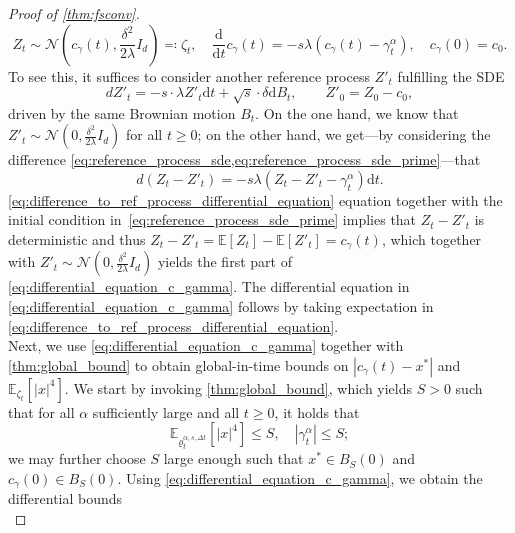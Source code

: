 \documentclass[reqno]{amsart}
\numberwithin{algorithm}{section}
\newcommand{\diff}{\mathrm{d}}
\newcommand{\EE}{{\mathbb E}}
\newcommand{\mc}[1]{\mathcal{#1}}
\begin{document}
{\begin{proof}[Proof of \cref{thm:fsconv}]
\begin{equation}
        Z_t \sim \mc{N}(c_\gamma(t), \frac{\delta^2}{2\lambda} I_d) \eqqcolon \zeta_t, \quad\frac{\diff}{\diff t} c_\gamma(t) = -s \lambda (c_\gamma(t) - \gamma^\alpha_t), \quad c_\gamma(0) = c_0.
    \end{equation}
    To see this, it suffices to consider another reference process $Z'_t$ fulfilling the SDE
    \begin{equation}\label{eq:reference_process_sde_prime}
        dZ'_t = -s \cdot \lambda Z'_t \diff t + \sqrt{s}\cdot\delta \diff B_t, \qquad Z'_0 = Z_0 - c_0, 
    \end{equation}
    driven by the same Brownian motion $B_t$. On the one hand, we know that $Z'_t \sim \mc{N}(0, \frac{\delta^2}{2\lambda} I_d)$ for all $t \geq 0$; on the other hand, we get---by considering the difference \cref{eq:reference_process_sde,eq:reference_process_sde_prime}---that
    \begin{equation}\label{eq:difference_to_ref_process_differential_equation}
        d(Z_t - Z'_t) = - s \lambda (Z_t - Z'_t - \gamma^\alpha_t) \diff t.
    \end{equation}
    \cref{eq:difference_to_ref_process_differential_equation} equation together with the initial condition in~\eqref{eq:reference_process_sde_prime} implies that $Z_t - Z'_t$ is deterministic and thus $Z_t - Z'_t = \EE[Z_t] - \EE[Z'_t] = c_\gamma(t)$, which together with $Z'_t \sim \mc{N}(0, \frac{\delta^2}{2\lambda} I_d)$ yields the first part of \cref{eq:differential_equation_c_gamma}. The differential equation in \cref{eq:differential_equation_c_gamma} follows by taking expectation in \cref{eq:difference_to_ref_process_differential_equation}. \\
   Next, we use \cref{eq:differential_equation_c_gamma} together with \cref{thm:global_bound} to obtain global-in-time bounds on $|c_\gamma(t) - x^*|$ and $\EE_{\zeta_t}[|x|^4]$. We start by invoking \cref{thm:global_bound}, which yields $S > 0$ such that for all $\alpha$ sufficiently large and all $t \geq 0$, it holds that
    \begin{equation}\label{eq:global_in_time_bounds_in_proof}
        \EE_{\varrho_{t}^{\alpha,s,\Delta t}}[|x|^4] \leq S, \quad |\gamma_t^\alpha| \leq S;
    \end{equation}
    we may further choose $S$ large enough such that $x^* \in B_S(0)$ and $c_\gamma(0) \in B_S(0)$.
    Using \cref{eq:differential_equation_c_gamma}, we obtain the differential bounds
    \begin{equation}\label{eq:differential_c_gamma_bounds}

\end{equation}
\end{proof}}
\end{document}
